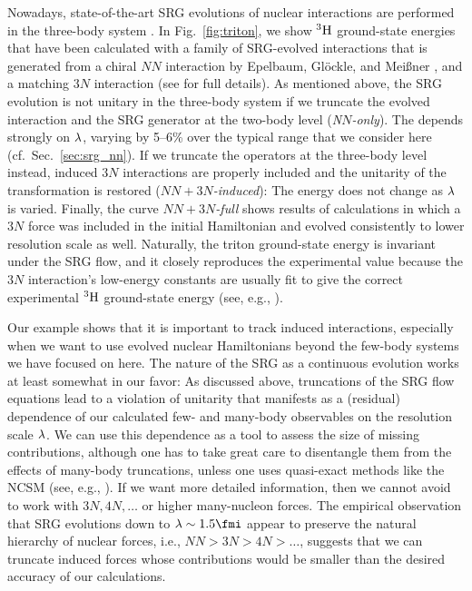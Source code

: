 Nowadays, state-of-the-art SRG evolutions of nuclear interactions are 
performed in the three-body system \cite{Jurgenson:2009bs,Jurgenson:2011zr,Jurgenson:2013fk, 
Hebeler:2012ly,Wendt:2013uq}. In Fig.~\ref{fig:triton}, we show 
$\nuc{H}{3}$ ground-state energies that have been calculated with
a family of SRG-evolved interactions that is generated from a 
chiral \NNLO{} $NN$ interaction by Epelbaum, Gl\"ockle, and Mei\ss{}ner 
\cite{Epelbaum:2002nr,Epelbaum:2006mo},
and a matching $3N$ interaction (see \cite{Hebeler:2012ly} for
full details). As mentioned above, the SRG evolution is not unitary in 
the three-body system if we truncate the evolved interaction and
the SRG generator at the two-body level (\emph{N$N$-only}). The 
depends strongly on $\lambdaSRG$, varying by 5--6\% over the 
typical range that we consider here (cf.~Sec.~\ref{sec:srg_nn}). 
If we truncate the operators at the three-body level instead, induced 
$3N$ interactions are properly included and the unitarity of the 
transformation is restored (\emph{$NN\!+\!3N$-induced}): 
The energy does not change as $\lambdaSRG$ is varied. Finally, the 
curve \emph{$NN\!+\!3N$-full} shows results of calculations in
which a $3N$ force was included in the initial Hamiltonian and
evolved consistently to lower resolution scale as well. Naturally,
the triton ground-state energy is invariant under the SRG flow, and 
it closely reproduces the experimental value because the $3N$ interaction's 
low-energy constants are usually fit to give the correct experimental 
$\nuc{H}{3}$ ground-state energy (see, e.g., 
\cite{Epelbaum:2009ve,Machleidt:2011bh,Gazit:2009qf}).

Our example shows that it is important to track induced interactions,
especially when we want to use evolved nuclear Hamiltonians beyond
the few-body systems we have focused on here. The nature of the SRG 
as a continuous evolution works at least somewhat in our favor: As
discussed above, truncations of the SRG flow equations lead to a 
violation of unitarity that manifests as a (residual) dependence 
of our calculated few- and many-body observables on the resolution 
scale $\lambdaSRG$. We can use this dependence as a tool to assess 
the size of missing contributions, although one has to take great
care to disentangle them from the effects of many-body truncations,
unless one uses quasi-exact methods like the NCSM (see, e.g., 
\cite{Bogner:2010pq,Jurgenson:2009bs,Hebeler:2012ly,Roth:2011kx,Hergert:2013mi,Hergert:2013ij,Binder:2014fk,
Soma:2014eu,Griesshammer:2015dp}). If we want more detailed information,
then we cannot avoid to work with $3N, 4N, \ldots$ or higher many-nucleon 
forces. The empirical observation that SRG evolutions down to $\lambdaSRG\sim1.5\fmi$
appear to preserve the natural hierarchy of nuclear forces, i.e.,  
$NN > 3N > 4N > \ldots$, suggests that we can truncate induced
forces whose contributions would be smaller than the desired accuracy 
of our calculations. 

